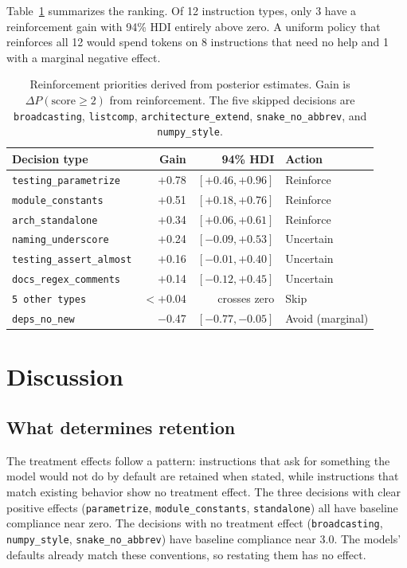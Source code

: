 \documentclass{llncs}
\begin{document}
Table~\ref{tab:policy} summarizes the ranking. Of 12 instruction types,
only 3 have a reinforcement gain with 94\% HDI entirely above zero. A
uniform policy that reinforces all 12 would spend tokens on 8
instructions that need no help and 1 with a marginal negative
effect.

\begin{table}[t]
\caption{Reinforcement priorities derived from posterior
estimates. Gain is $\Delta P(\text{score} \geq 2)$ from reinforcement.
The five skipped decisions are \texttt{broadcasting},
\texttt{listcomp}, \texttt{architecture\_extend},
\texttt{snake\_no\_abbrev}, and \texttt{numpy\_style}.}\label{tab:policy}
\centering
\begin{tabular}{lrrl}
\toprule
Decision type & Gain & 94\% HDI & Action \\
\midrule
\texttt{testing\_parametrize}    & $+$0.78 & $[+0.46, +0.96]$ & Reinforce \\
\texttt{module\_constants}       & $+$0.51 & $[+0.18, +0.76]$ & Reinforce \\
\texttt{arch\_standalone}        & $+$0.34 & $[+0.06, +0.61]$ & Reinforce \\
\texttt{naming\_underscore}      & $+$0.24 & $[-0.09, +0.53]$ & Uncertain \\
\texttt{testing\_assert\_almost} & $+$0.16 & $[-0.01, +0.40]$ & Uncertain \\
\texttt{docs\_regex\_comments}   & $+$0.14 & $[-0.12, +0.45]$ & Uncertain \\
\texttt{5 other types}           & $< +0.04$ & crosses zero & Skip \\
\texttt{deps\_no\_new}           & $-$0.47 & $[-0.77, -0.05]$ & Avoid (marginal) \\
\bottomrule
\end{tabular}
\end{table}


\section{Discussion}
\label{sec:discussion}

\subsection{What determines retention}

The treatment effects follow a pattern: instructions that ask for
something the model would not do by default are retained when stated,
while instructions that match existing behavior show no treatment
effect. The three decisions with clear positive effects
(\texttt{parametrize}, \texttt{module\_constants},
\texttt{standalone}) all have baseline compliance near zero. The
decisions with no treatment effect (\texttt{broadcasting},
\texttt{numpy\_style}, \texttt{snake\_no\_abbrev}) have baseline
compliance near 3.0. The models' defaults already match these
conventions, so restating them has no effect.
\end{document}
